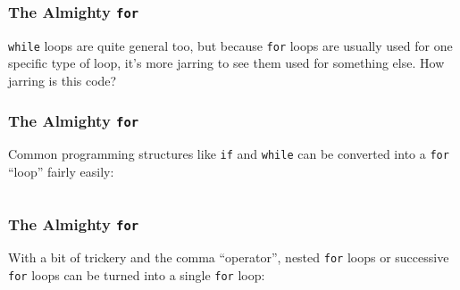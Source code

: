\documentclass[xcolor]{beamer}
\begin{document}
\begin{frame}
	\frametitle{The Almighty \texttt{for}}
	\pause
	
	\texttt{while} loops are quite general too, but because \texttt{for} loops are usually used for one specific type of loop, it's more jarring to see them used for something else. \pause How jarring is this code?
	
	
\end{frame}

\begin{frame}
	\frametitle{The Almighty \texttt{for}}
	\pause
	
	Common programming structures like \texttt{if} and \texttt{while} can be converted into a \texttt{for} ``loop'' fairly easily:
	\pause
	
	\begin{columns}
		\begin{column}{0.45\textwidth}
			\centering
			
			\pause
			
		\end{column}
		\pause
		\begin{column}{0.45\textwidth}
			\centering
			
			\pause
			
		\end{column}
	\end{columns}
\end{frame}

\begin{frame}
	\frametitle{The Almighty \texttt{for}}
	\pause
	
	With a bit of trickery and the comma ``operator'', nested \texttt{for} loops or successive \texttt{for} loops can be turned into a single \texttt{for} loop:
	\pause
	
	\begin{columns}
		\begin{column}{0.45\textwidth}
			\centering
			
			\pause
			
		\end{column}
		\pause
		\begin{column}{0.45\textwidth}
			\centering
			
			\pause
			
		\end{column}
	\end{columns}
\end{frame}
\end{document}
